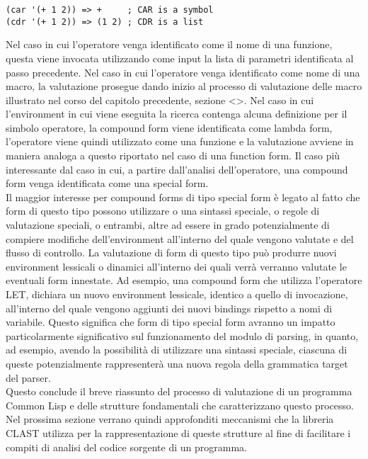 \begin{lstlisting}
(car '(+ 1 2)) => +     ; CAR is a symbol
(cdr '(+ 1 2)) => (1 2) ; CDR is a list
\end{lstlisting}

Nel caso in cui l’operatore venga identificato come il nome di una funzione,
questa viene invocata utilizzando come input la lista di parametri
identificata al passo precedente. Nel caso in cui l’operatore venga
identificato come nome di una macro, la valutazione prosegue dando inizio al
processo di valutazione delle macro illustrato nel corso del capitolo
precedente, sezione <>. Nel caso in cui l’environment in cui viene eseguita la
ricerca contenga alcuna definizione per il simbolo operatore, la compound form
viene identificata come lambda form, l’operatore viene quindi utilizzato come
una funzione e la valutazione avviene in maniera analoga a questo riportato
nel caso di una function form. Il caso più interessante dal caso in cui, a
partire dall’analisi dell’operatore, una compound form venga identificata come
una special form.\\

Il maggior interesse per compound forms di tipo special form è legato al fatto
che form di questo tipo possono utilizzare o una sintassi speciale, o regole
di valutazione speciali, o entrambi, altre ad essere in grado potenzialmente
di compiere modifiche dell’environment all’interno del quale vengono valutate
e del flusso di controllo. La valutazione di form di questo tipo può produrre
nuovi environment lessicali o dinamici all’interno dei quali verrà verranno
valutate le eventuali form innestate. Ad esempio, una compound form che
utilizza l’operatore LET, dichiara un nuovo environment lessicale, identico a
quello di invocazione, all’interno del quale vengono aggiunti dei nuovi
bindings rispetto a nomi di variabile. Questo significa che form di tipo
special form avranno un impatto particolarmente significativo sul
funzionamento del modulo di parsing, in quanto, ad esempio, avendo la
possibilità di utilizzare una sintassi speciale, ciascuna di queste
potenzialmente rappresenterà una nuova regola della grammatica target del
parser.\\

Questo conclude il breve riassunto del processo di valutazione di un programma
Common Lisp e delle strutture fondamentali che caratterizzano questo processo.
Nel prossima sezione verrano quindi approfonditi meccanismi che la libreria
CLAST utilizza per la rappresentazione di queste strutture al fine di
facilitare i compiti di analisi del codice sorgente di un programma.

